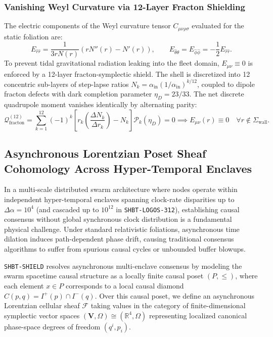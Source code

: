 \documentclass[11pt,onecolumn]{article}
\begin{document}
\subsubsection{Vanishing Weyl Curvature via 12-Layer Fracton Shielding}
The electric components of the Weyl curvature tensor $C_{\mu\nu\rho\sigma}$ evaluated for the static foliation are:
\begin{equation}
    E_{\hat{r}\hat{r}} = \frac{1}{3 r N(r)} \left( r N''(r) - N'(r) \right), \qquad E_{\hat{\theta}\hat{\theta}} = E_{\hat{\phi}\hat{\phi}} = -\frac{1}{2} E_{\hat{r}\hat{r}}.
    \label{eq:electric_weyl}
\end{equation}
To prevent tidal gravitational radiation leaking into the fleet domain, $E_{\mu\nu} \equiv 0$ is enforced by a 12-layer fracton-symplectic shield. The shell is discretized into 12 concentric sub-layers of step-lapse ratios $N_k = \alpha_{\text{in}} (1/\alpha_{\text{in}})^{k/12}$, coupled to dipole fracton defects with dark completion parameter $\eta_D = 23/33$. The net discrete quadrupole moment vanishes identically by alternating parity:
\begin{equation}
    \mathcal{Q}_{\text{fracton}}^{(12)} = \sum_{k=1}^{12} (-1)^k \left[ r_k \left( \frac{\Delta N_k}{\Delta r_k} \right) - N_k \right] \mathcal{P}_k(\eta_D) = 0 \implies E_{\mu\nu}(r) \equiv 0 \quad \forall r \notin \Sigma_{\text{wall}}.
    \label{eq:weyl_cancellation}
\end{equation}

\FloatBarrier
\subsection{Asynchronous Lorentzian Poset Sheaf Cohomology Across Hyper-Temporal Enclaves}
\label{sec:poset_sheaf_cohomology}

In a multi-scale distributed swarm architecture where nodes operate within independent hyper-temporal enclaves spanning clock-rate disparities up to $\Delta\alpha = 10^4$ (and cascaded up to $10^{12}$ in \texttt{SHBT-LOGOS-312}), establishing causal consensus without global synchronous clock distribution is a fundamental physical challenge. Under standard relativistic foliations, asynchronous time dilation induces path-dependent phase drift, causing traditional consensus algorithms to suffer from spurious causal cycles or unbounded buffer blowups.

\texttt{SHBT-SHIELD} resolves asynchronous multi-enclave consensus by modeling the swarm spacetime causal structure as a locally finite causal poset $(P, \le)$, where each element $x \in P$ corresponds to a local causal diamond $C(p, q) = I^+(p) \cap I^-(q)$. Over this causal poset, we define an asynchronous Lorentzian cellular sheaf $\mathcal{F}$ taking values in the category of finite-dimensional symplectic vector spaces $(\mathbf{V}, \Omega) \cong (\mathbb{R}^4, \Omega)$ representing localized canonical phase-space degrees of freedom $(q^i, p_i)$.
\end{document}
